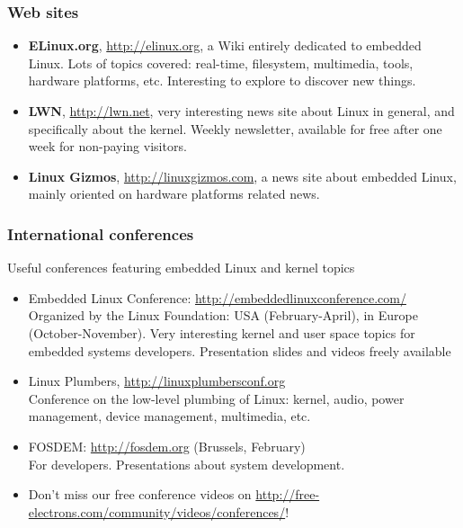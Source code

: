 \begin{frame}
  \frametitle{Web sites}
  \begin{itemize}
  \item {\bf ELinux.org}, \url{http://elinux.org}, a Wiki entirely
    dedicated to embedded Linux. Lots of topics covered: real-time,
    filesystem, multimedia, tools, hardware platforms,
    etc. Interesting to explore to discover new things.
  \item {\bf LWN}, \url{http://lwn.net}, very interesting news site
    about Linux in general, and specifically about the kernel. Weekly
    newsletter, available for free after one week for non-paying
    visitors.
  \item {\bf Linux Gizmos}, \url{http://linuxgizmos.com}, a news site
    about embedded Linux, mainly oriented on hardware platforms
    related news.
  \end{itemize}
\end{frame}

\begin{frame}
  \frametitle{International conferences}
  Useful conferences featuring embedded Linux and kernel topics
  \begin{itemize}
  \item Embedded Linux Conference: \url{http://embeddedlinuxconference.com/}\\
    Organized by the Linux Foundation: USA (February-April), in Europe
    (October-November).
    Very interesting kernel and user space topics for embedded systems developers.
    Presentation slides and videos freely available
  \item Linux Plumbers, \url{http://linuxplumbersconf.org}\\
    Conference on the low-level plumbing of Linux: kernel, audio,
    power management, device management, multimedia, etc.
  \item FOSDEM: \url{http://fosdem.org} (Brussels, February)\\
    For developers. Presentations about system development.
  \item Don't miss our free conference videos on
    \url{http://free-electrons.com/community/videos/conferences/}!
  \end{itemize}
\end{frame}
